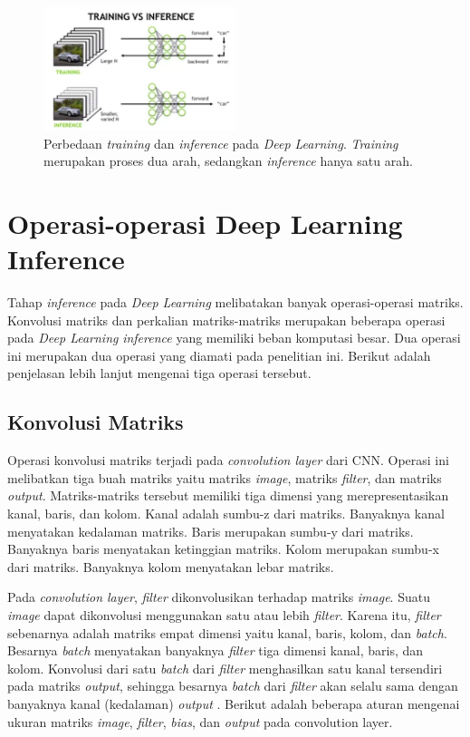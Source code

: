 \begin{figure}
	\centering
	\includegraphics[width=0.50\textwidth]
	{pics/trainingvsinference.png}
	\caption{Perbedaan \textit{training} dan \textit{inference} pada \textit{Deep Learning}. \textit{Training} merupakan proses dua arah, sedangkan \textit{inference} hanya satu arah.}
	\label{fig:trainvsinfer}
\end{figure}

\section{Operasi-operasi Deep Learning Inference}
Tahap \textit{inference} pada \textit{Deep Learning} melibatakan banyak operasi-operasi matriks. Konvolusi matriks dan perkalian matriks-matriks merupakan beberapa operasi pada \textit{Deep Learning} \textit{inference} yang memiliki beban komputasi besar. Dua operasi ini merupakan dua operasi yang diamati pada penelitian ini. Berikut adalah penjelasan lebih lanjut mengenai tiga operasi tersebut.

\subsection{Konvolusi Matriks}
Operasi konvolusi matriks terjadi pada \textit{convolution layer} dari CNN. Operasi ini melibatkan tiga buah matriks yaitu matriks \textit{image}, matriks \textit{filter}, dan matriks \textit{output}. Matriks-matriks tersebut memiliki tiga dimensi yang merepresentasikan kanal, baris, dan kolom. Kanal adalah sumbu-z dari matriks. Banyaknya kanal menyatakan kedalaman matriks. Baris merupakan sumbu-y dari matriks. Banyaknya baris menyatakan ketinggian matriks. Kolom merupakan sumbu-x dari matriks. Banyaknya kolom menyatakan lebar matriks.

Pada \textit{convolution layer}, \textit{filter} dikonvolusikan terhadap matriks \textit{image}. Suatu \textit{image} dapat dikonvolusi menggunakan satu atau lebih \textit{filter}. Karena itu, \textit{filter} sebenarnya adalah matriks empat dimensi yaitu kanal, baris, kolom, dan \textit{batch}. Besarnya \textit{batch} menyatakan banyaknya \textit{filter} tiga dimensi kanal, baris, dan kolom. Konvolusi dari satu \textit{batch} dari \textit{filter} menghasilkan satu kanal tersendiri pada matriks \textit{output}, sehingga besarnya \textit{batch} dari \textit{filter} akan selalu sama dengan banyaknya kanal (kedalaman) \textit{output} \cite{deeplearningmatrix}. Berikut adalah beberapa aturan mengenai ukuran matriks \textit{image}, \textit{filter}, \textit{bias}, dan \textit{output} pada convolution layer. 

